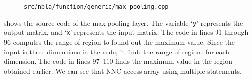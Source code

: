 \begin{figure}[tbp]
  \centering
  
  \caption{\texttt{src/nbla/function/generic/max\_pooling.cpp}}
  \label{fig:code_max_pooling}
\end{figure}

 shows the source code of the max-pooling layer. The variable `\texttt{y}' represents the output matrix, and `\texttt{x}' represents the input matrix.
The code in lines 91 through 96 computes the range of region to found out the maximum value. Since the input is three dimensions in the code, it finds the range of regions for each dimension.  The code in lines 97--110 finds the maximum value in the region obtained earlier.  We can see that NNC access array using multiple statements.
